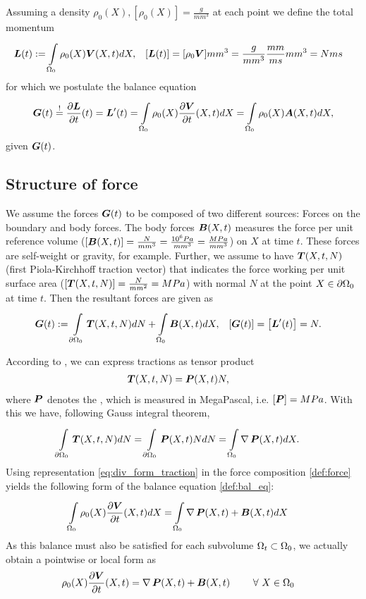 Assuming a density $\rho_0(X), \left[\rho_0(X)\right] = \frac{g}{mm^3}$ at each point we define the total momentum
\begin{align*}
 	\boldsymbol{L}(t) &:= \int\limits_{\Omega_0}^{} \rho_0(X)\boldsymbol{V}(X,t) dX, & [\boldsymbol{L}(t)] &= [\rho_0\boldsymbol{V}]mm^3 = \frac{g}{mm^3}\frac{mm}{ms}mm^3 = Nms
\end{align*} 
for which we postulate the balance equation
\begin{align}
	\boldsymbol{G}(t) \stackrel{!}{=} \frac{\partial \boldsymbol{L}}{\partial t}(t) = \boldsymbol{L}'(t) = \int\limits_{\Omega_0}^{} \rho_0(X)\frac{\partial \boldsymbol{V}}{\partial t}(X,t) dX = \int\limits_{\Omega_0}^{} \rho_0(X)\boldsymbol{A}(X,t) dX,\label{def:bal_eq}
\end{align}
given  $\boldsymbol{G}(t)$.

\subsection{Structure of force}
We assume the forces $\boldsymbol{G}(t)$ to be composed of two different sources: Forces on the boundary and body forces.
The body forces $\boldsymbol{B}(X,t)$ measures the force per unit reference volume ($\left[\boldsymbol{B}(X,t)\right] = \frac{N}{mm^3} = \frac{10^{6}Pa}{mm^3} = \frac{MPa}{mm^3}$) on $X$ at time $t$.
These forces are self-weight or gravity, for example.
Further, we assume to have  $\boldsymbol{T}(X,t,N)$ (first Piola-Kirchhoff traction vector) that indicates the force working per unit
surface area ($[\boldsymbol{T}(X,t,N)] = \frac{N}{mm^2} = MPa$) with normal $N$ at the point $X\in\partial\Omega_0$ at time $t$.
Then the resultant forces are given as
\begin{align}
	\boldsymbol{G}(t) &:= \int\limits_{\partial\Omega_0}^{} \boldsymbol{T}(X,t,N)dN + \int\limits_{\Omega_0}^{} \boldsymbol{B}(X,t)dX, & \left[\boldsymbol{G}(t)\right] = \left[\boldsymbol{L}'(t)\right] &= N. \label{def:force}
\end{align}

According to , we can express tractions as tensor product
\begin{align}
	\boldsymbol{T}(X,t,N) &= \boldsymbol{P}(X,t)N,\label{def:T}
\end{align}
where $\boldsymbol{P}$ denotes the , which is measured in MegaPascal, i.e. $[\boldsymbol{P}] = MPa$.
With this we have, following Gauss integral theorem,
\begin{align}
	\int\limits_{\partial\Omega_0}^{} \boldsymbol{T}(X,t,N)dN &= \int\limits_{\partial\Omega_0}^{} \boldsymbol{P}(X,t)NdN = \int\limits_{\Omega_0}^{} \operatorname{\nabla}\boldsymbol{P}(X,t)dX.\label{eq:div_form_traction}
\end{align}
Using representation \eqref{eq:div_form_traction} in the force composition 
\eqref{def:force} yields the following form of the balance equation \eqref{def:bal_eq}:
\begin{align}
	\int\limits_{\Omega_0}^{} \rho_0(X)\frac{\partial \boldsymbol{V}}{\partial t}(X,t) dX &= \int\limits_{\Omega_0}^{} \operatorname{\nabla}\boldsymbol{P}(X,t) + \boldsymbol{B}(X,t) dX
\end{align}
As this balance must also be satisfied for each subvolume $\Omega_t\subset\Omega_0$, we actually obtain a pointwise or local form as
\begin{align}
	\rho_0(X)\frac{\partial \boldsymbol{V}}{\partial t}(X,t) &= \operatorname{\nabla}\boldsymbol{P}(X,t) + \boldsymbol{B}(X,t) \qquad ~\forall~ X\in\Omega_0\label{def:maineq}
\end{align}

